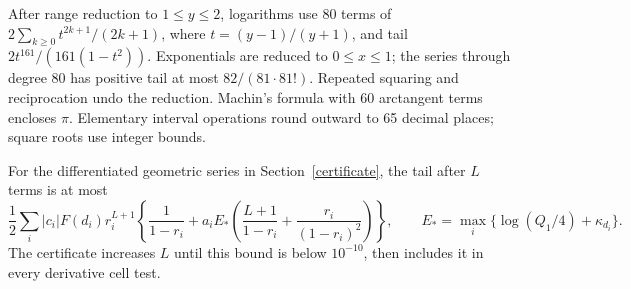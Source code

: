 \documentclass[11pt]{article}
\begin{document}
After range reduction to \(1\le y\le2\), logarithms use 80 terms
of \(2\sum_{k\ge0}t^{2k+1}/(2k+1)\), where
\(t=(y-1)/(y+1)\), and tail
\(2t^{161}/(161(1-t^2))\). Exponentials are reduced to
\(0\le x\le1\); the series through degree 80 has positive tail
at most \(82/(81\cdot81!)\). Repeated squaring and reciprocation
undo the reduction. Machin's formula with 60 arctangent terms
encloses \(\pi\). Elementary interval operations round outward
to 65 decimal places; square roots use integer bounds.

For the differentiated geometric series in Section~\ref{certificate},
the tail after
\(L\) terms is at most
\[
 \frac12\sum_i |c_i|F(d_i)r_i^{L+1}
 \left\{\frac1{1-r_i}+a_i E_*
       \left(\frac{L+1}{1-r_i}+\frac{r_i}{(1-r_i)^2}\right)\right\},
 \qquad E_*=\max_i\{\log(Q_1/4)+\kappa_{d_i}\}.
\]
The certificate increases \(L\) until this bound is below
\(10^{-10}\), then includes it in every derivative cell test.
\end{document}
